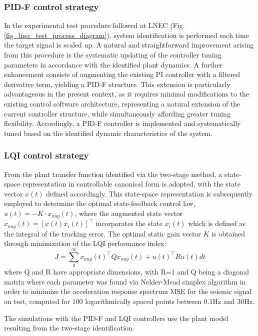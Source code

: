 \documentclass[conference]{IEEEtran}
\begin{document}
\subsubsection{ PID-F control strategy}
In the experimental test procedure followed at LNEC (Fig. \ref{fig_lnec_test_process_diagram}), system identification is performed each time the target signal is scaled up. A natural and straightforward improvement arising from this procedure is the systematic updating of the controller tuning parameters in accordance with the identified plant dynamics. A further enhancement consists of augmenting the existing PI controller with a filtered derivative term, yielding a PID-F structure. This extension is particularly advantageous in the present context, as it requires minimal modifications to the existing control software architecture, representing a natural extension of the current controller structure, while simultaneously affording greater tuning flexibility. Accordingly, a PID-F controller is implemented and systematically tuned based on the identified dynamic characteristics of the system.

\subsubsection{LQI control strategy}
From the plant transfer function identified via the two-stage method, a state-space representation in controllable canonical form is adopted, with the state vector $x(t)$ defined accordingly. This state-space representation is subsequently employed to determine the optimal state-feedback control law, $u(t) = -K \cdot x_{aug}(t)$, where the augmented state vector $x_{aug}(t) = [x(t) x_i(t)]^\intercal$ incorporates the state $x_i(t)$ which is defined as the integral of the tracking error. The optimal static gain vector $K$ is obtained through minimization of the LQI performance index:
\begin{equation}
 J = \sum_{0}^{\infty}{{x_{aug}(t)}^\intercal Q} x_{aug}(t)+{u(t)}^\intercal R u(t) dt
\end{equation}
where Q and R have appropriate dimensions, with R=1 and Q being a diagonal matrix where each parameter was found via Nelder-Mead simplex algorithm \citep{lagarias1998} in order to minimize the acceleration response spectrum MSE for the seismic signal on test, computed for 100 logarithmically spaced points between 0.1Hz and 30Hz. 

The simulations with the PID-F and LQI controllers use the plant model resulting from the two-stage identification.
\end{document}
